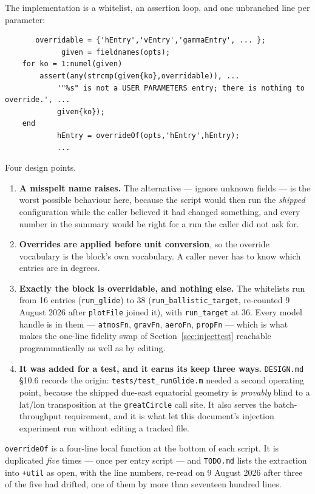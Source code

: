 \documentclass[11pt]{article}
\newcommand{\code}[1]{\texttt{#1}}
\newcommand{\pkg}[1]{\texttt{+#1}}
\begin{document}
The implementation is a whitelist, an assertion loop, and one unbranched line
per parameter:

\begin{lstlisting}
       overridable = {'hEntry','vEntry','gammaEntry', ... };
             given = fieldnames(opts);
    for ko = 1:numel(given)
        assert(any(strcmp(given{ko},overridable)), ...
            '"%s" is not a USER PARAMETERS entry; there is nothing to override.', ...
            given{ko});
    end
            hEntry = overrideOf(opts,'hEntry',hEntry);
            ...
\end{lstlisting}

Four design points.

\begin{enumerate}
\item \textbf{A misspelt name raises.} The alternative --- ignore unknown
fields --- is the worst possible behaviour here, because the script would then
run the \emph{shipped} configuration while the caller believed it had changed
something, and every number in the summary would be right for a run the caller
did not ask for.
\item \textbf{Overrides are applied before unit conversion}, so the override
vocabulary is the block's own vocabulary. A caller never has to know which
entries are in degrees.
\item \textbf{Exactly the block is overridable, and nothing else.} The
whitelists run from 16 entries (\code{run\_glide}) to 38
(\code{run\_ballistic\_target}, re-counted 9 August 2026 after \code{plotFile}
joined it), with \code{run\_target} at 36. Every model
handle is in them --- \code{atmosFn},
\code{gravFn}, \code{aeroFn}, \code{propFn} --- which is what makes the
one-line fidelity swap of Section~\ref{sec:injecttest} reachable
programmatically as well as by editing.
\item \textbf{It was added for a test, and it earns its keep three ways.}
\code{DESIGN.md} \S10.6 records the origin: \code{tests/test\_runGlide.m}
needed a second operating point, because the shipped due-east equatorial
geometry is \emph{provably} blind to a lat/lon transposition at the
\code{greatCircle} call site. It also serves the batch-throughput requirement,
and it is what let this document's injection experiment run without editing a
tracked file.
\end{enumerate}

\code{overrideOf} is a four-line local function at the bottom of each script.
It is duplicated \emph{five} times --- once per entry script --- and
\code{TODO.md} lists the extraction into \pkg{util} as open, with the line
numbers, re-read on 9 August 2026 after three of the five had drifted, one of
them by more than seventeen hundred lines.
\end{document}
